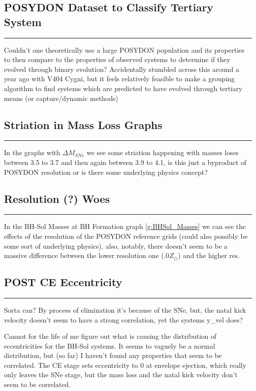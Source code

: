 \documentclass{article}
\theoremstyle{mytheoremstyle}
\theoremstyle{mytheoremstyle}
\theoremstyle{myproblemstyle}
\theoremstyle{myproblemstyle}
\begin{document}
    \subsection{POSYDON Dataset to Classify Tertiary System}
    \hrule
    \vspace{.5cm}

    Couldn't one theoretically use a large POSYDON population and its properties to then compare to the properties of observed systems to determine if they evolved through binary evolution? Accidentally stumbled across this around a year ago with V404 Cygni, but it feels relatively feasible to make a grouping algorithm to find systems which are predicted to have evolved through tertiary means (or capture/dynamic methods) 

    \subsection{Striation in Mass Loss Graphs}
    \hrule
    \vspace{.5cm}
    In the graphs with \(\Delta M_{SNe}\) we see some striation happening with masses loses between 3.5 to 3.7 and then again between 3.9 to 4.1, is this just a byproduct of POSYDON resolution or is there some underlying physics concept?
    
    \subsection{Resolution (?) Woes}
    \hrule
    \vspace{.5cm}
    In the BH-Sol Masses at BH Formation graph \ref{g:BHSol_Masses} we can see the effects of the resolution of the POSYDON reference grids (could also possibly be some sort of underlying physics), also, notably, there doesn't seem to be a massive difference between the lower resolution one (\(.0Z_\odot\)) and the higher res. 

    \subsection{POST CE Eccentricity}
    \hrule
    \vspace{.5cm}
    Sorta can? By process of elimination it's because of the SNe, but, the natal kick velocity doesn't seem to have a strong correlation, yet the systems y\_vel does?

    Cannot for the life of me figure out what is causing the distribution of eccentricities for the BH-Sol systems. It seems to vaguely be a normal distribution, but (so far) I haven't found any properties that seem to be correlated. The CE stage sets eccentricity to 0 at envelope ejection, which really only leaves the SNe stage, but the mass loss and the natal kick velocity don't seem to be correlated. 
\end{document}
